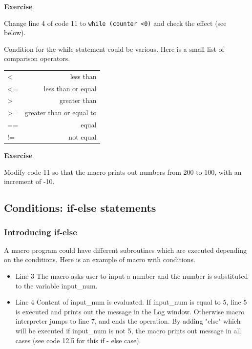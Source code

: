 \documentclass[11pt,a4paper,oneside]{report}
\newenvironment{indentexercise}[1]%
{{\setlength{\leftmargin}{2em}}%
\textbf{Exercise \thesubsection-#1}%
\begin{list}{}%
	\item%
}
{\end{list}}
\newenvironment{indentCom}%
{\begin{list}{}%
         {\setlength{\leftmargin}{1em}}%
         \item[]%
}
{\end{list}}
\newcommand{\ilcom}[1]{\texttt{\small#1}}
\begin{document}
\begin{indentexercise}{2}
Change line 4 of code 11 to \ilcom{while (counter <0)} and check the effect (see below).
\end{indentexercise}



Condition for the while-statement could be various. Here is a small list of comparison operators.

\begin{indentCom}
 \begin{tabular*}{0.5\textwidth}{ l r }
< & less than \\
<= & less than or equal\\ 
> & greater than\\ 
>= & greater than or equal to\\
== & equal\\
!= & not equal\\
 \end{tabular*}
\end{indentCom}

\begin{indentexercise}{3}
Modify code 11 so that the macro prints out numbers from 200 to 100, with an increment of -10. 
\end{indentexercise}

\subsection{Conditions: if-else statements}
\subsubsection{Introducing if-else}
A macro program could have different subroutines which are executed depending on the conditions. Here is an example of macro with conditions.  

\begin{itemize}
\item Line 3 The macro asks user to input a number and the number is substituted to the variable input\_num.
\item Line 4 Content of input\_num is evaluated. If input\_num is equal to 5, line 5 is executed and prints out the message in the Log window. Otherwise macro interpreter jumps to line 7, and ends the operation.  By adding "else" which will be executed if input\_num is not 5, the macro prints out message in all cases (see code 12.5 for this if - else case). 
\end{itemize}
\end{document}
